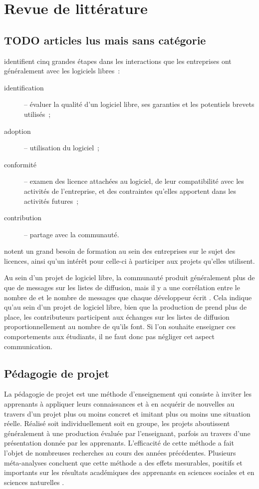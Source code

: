 \chapter{Revue de littérature}

\section*{TODO articles lus mais sans catégorie}

 identifient cinq grandes étapes dans les interactions que les entreprises ont
généralement avec les logiciels libres :
\begin{description}
    \item[identification] -- évaluer la qualité d'un logiciel libre, ses garanties et les potentiels brevets
        utilisés ;
    \item[adoption] -- utilisation du logiciel ;
    \item[conformité] -- examen des licence attachées au logiciel, de leur compatibilité avec les activités de
        l'entreprise, et des contraintes qu'elles apportent dans les activités futures ;
    \item[contribution] -- partage avec la communauté.
\end{description}

\textcite{strategies-2012} notent un grand besoin de formation au sein des entreprises sur le sujet des
licences, ainsi qu'un intérêt pour celle-ci à participer aux projets qu'elles utilisent.

Au sein d'un projet de logiciel libre, la communauté produit généralement plus de  que de
messages sur les listes de diffusion, mais il y a une corrélation entre le nombre de  et le
nombre de messages que chaque développeur écrit . Cela indique qu'au
sein d'un projet de logiciel libre, bien que la production de  prend plus de place, les
contributeurs participent aux échanges sur les listes de diffusion proportionnellement au nombre de
 qu'ils font. Si l'on souhaite enseigner ces comportements aux étudiants, il ne faut donc pas
négliger cet aspect communication.

\section{Pédagogie de projet}

La pédagogie de projet est une méthode d'enseignement qui consiste à inviter les apprenants à appliquer leurs
connaissances et à en acquérir de nouvelles au travers d'un projet plus ou moins concret et imitant plus ou
moins une situation réelle. Réalisé soit individuellement soit en groupe, les projets aboutissent généralement
à une production évaluée par l'enseignant, parfois au travers d'une présentation donnée par les apprenants.
L'efficacité de cette méthode a fait l'objet de nombreuses recherches au cours des années précédentes.
Plusieurs méta-analyses concluent que cette méthode a des effets mesurables, positifs et importants sur les
résultats académiques des apprenants en sciences sociales et en sciences naturelles
.

